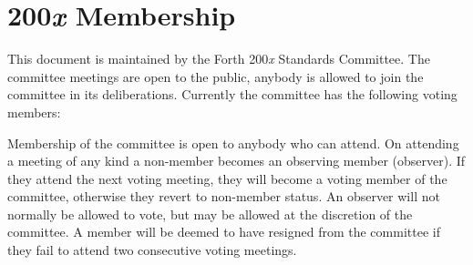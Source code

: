 \chapter*{200\emph{x} Membership}
\label{members}

This document is maintained by the Forth 200\emph{x} Standards
Committee. The committee meetings are open to the public, anybody
is allowed to join the committee in its deliberations. Currently
the committee has the following voting members:

Membership of the committee is open to anybody who can attend.  On
attending a meeting of any kind a non-member becomes an observing
member (observer).  If they attend the next voting meeting, they
will become a voting member of the committee, otherwise they revert
to non-member status.  An observer will not normally be allowed to
vote, but may be allowed at the discretion of the committee.  A
member will be deemed to have resigned from the committee if they
fail to attend two consecutive voting meetings.

\newcommand{\email}[1]{%
	\texttt{\randomize{#1}}
}

